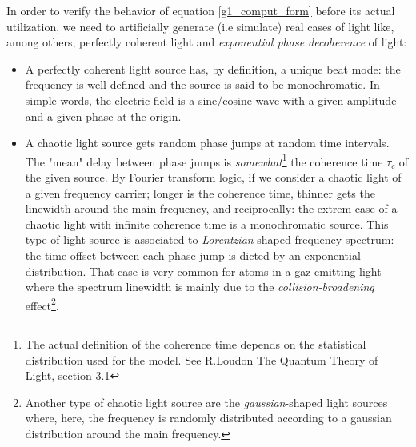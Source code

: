 \documentclass[10pt]{report}
\begin{document}
In order to verify the behavior of equation \eqref{g1_comput_form} before its actual utilization, we need to artificially generate (i.e simulate) real cases of light like, among others, perfectly coherent light and \textit{exponential phase decoherence} of light:

\begin{itemize}
	\item A perfectly coherent light source has, by definition, a unique beat mode: the frequency is well defined and the source is said to be monochromatic. In simple words, the electric field is a sine/cosine wave with a given amplitude and a given phase at the origin.
	\item A chaotic light source gets random phase jumps at random time intervals. The "mean" delay between phase jumps is \textit{somewhat}\footnote{The actual definition of the coherence time depends on the statistical distribution used for the model. See R.Loudon The Quantum Theory of Light, section 3.1} the coherence time $\tau_c$ of the given source. By Fourier transform logic, if we consider a chaotic light of a given frequency carrier; longer is the coherence time, thinner gets the linewidth around the main frequency, and reciprocally: the extrem case of a chaotic light with infinite coherence time is a monochromatic source. This type of light source is associated to \textit{Lorentzian}-shaped frequency spectrum: the time offset between each phase jump is dicted by an exponential distribution. That case is very common for atoms in a gaz emitting light where the spectrum linewidth is mainly due to the \textit{collision-broadening} effect\footnote{Another type of chaotic light source are the \textit{gaussian}-shaped light sources where, here, the frequency is randomly distributed according to a gaussian distribution around the main frequency.}.
\end{itemize}
\end{document}
